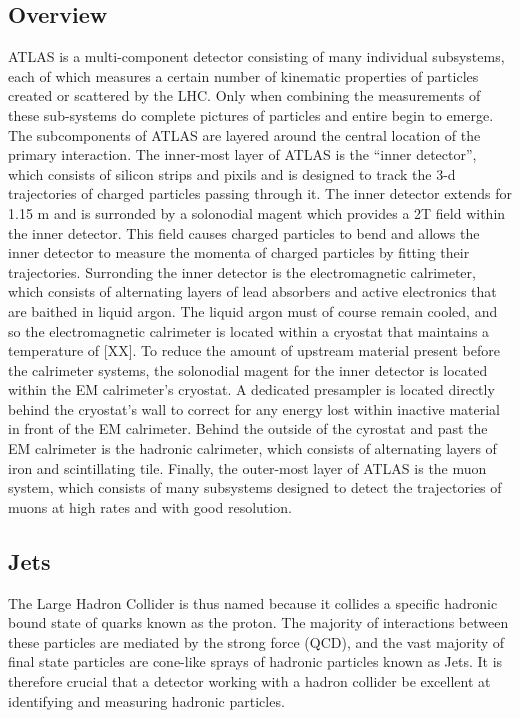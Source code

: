 \subsection{Overview}
ATLAS is a multi-component detector consisting of many individual subsystems, each of which measures a certain number of kinematic properties of particles created or scattered by the LHC.
Only when combining the measurements of these sub-systems do complete pictures of particles and entire begin to emerge.
The subcomponents of ATLAS are layered around the central location of the primary interaction.
The inner-most layer of ATLAS is the ``inner detector'', which consists of silicon strips and pixils and is designed to track the 3-d trajectories of charged particles passing through it.
The inner detector extends for 1.15 m and is surronded by a solonodial magent which provides a 2T field within the inner detector.
This field causes charged particles to bend and allows the inner detector to measure the momenta of charged particles by fitting their trajectories.
Surronding the inner detector is the electromagnetic calrimeter, which consists of alternating layers of lead absorbers and active electronics that are baithed in liquid argon.
The liquid argon must of course remain cooled, and so the electromagnetic calrimeter is located within a cryostat that maintains a temperature of [XX].
To reduce the amount of upstream material present before the calrimeter systems, the solonodial magent for the inner detector is located within the EM calrimeter's cryostat.
A dedicated presampler is located directly behind the cryostat's wall to correct for any energy lost within inactive material in front of the EM calrimeter.
Behind the outside of the cyrostat and past the EM calrimeter is the hadronic calrimeter, which consists of alternating layers of iron and scintillating tile.
Finally, the outer-most layer of ATLAS is the muon system, which consists of many subsystems designed to detect the trajectories of muons at high rates and with good resolution.
 



\subsection{Jets}

The Large Hadron Collider is thus named because it collides a specific hadronic bound state of quarks known as the proton.
The majority of interactions between these particles are mediated by the strong force (QCD), and the vast majority of final state particles are cone-like sprays of hadronic particles known as Jets.
It is therefore crucial that a detector working with a hadron collider be excellent at identifying and measuring hadronic particles.

